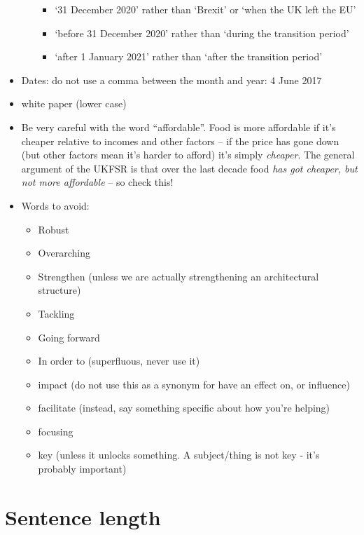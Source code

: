 \documentclass[
]{book}
\providecommand{\tightlist}{%
  \setlength{\itemsep}{0pt}\setlength{\parskip}{0pt}}
\begin{document}
\begin{itemize}
\begin{itemize}
    \begin{itemize}
    \tightlist
    \item
      `31 December 2020' rather than `Brexit' or `when the UK left the EU'
    \item
      `before 31 December 2020' rather than `during the transition period'
    \item
      `after 1 January 2021' rather than `after the transition period'
    \end{itemize}
  \end{itemize}
\item
  Dates: do not use a comma between the month and year: 4 June 2017
\item
  white paper (lower case)
\item
  Be very careful with the word ``affordable''. Food is more affordable if it's cheaper relative to incomes and other factors -- if the price has gone down (but other factors mean it's harder to afford) it's simply \emph{cheaper}. The general argument of the UKFSR is that over the last decade food \emph{has got cheaper, but not more affordable} -- so check this!
\item
  Words to avoid:

  \begin{itemize}
  \tightlist
  \item
    Robust
  \item
    Overarching
  \item
    Strengthen (unless we are actually strengthening an architectural structure)
  \item
    Tackling\\
  \item
    Going forward
  \item
    In order to (superfluous, never use it)
  \item
    impact (do not use this as a synonym for have an effect on, or influence)
  \item
    facilitate (instead, say something specific about how you're helping)
  \item
    focusing
  \item
    key (unless it unlocks something. A subject/thing is not key - it's probably important)
  \end{itemize}
\end{itemize}

\hypertarget{sentence-length}{%
\section{Sentence length}\label{sentence-length}}
\end{document}
